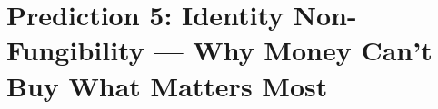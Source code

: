 \section{Prediction 5: Identity Non-Fungibility --- Why Money Can't Buy What Matters Most}
\label{app:prediction-identity}


\begin{abstract}
This appendix provides the complete technical foundation for Prediction 5 of the 
Complementarity-Context Framework: that identity constitutes a distinct welfare 
dimension that is not fungible with financial compensation. We develop the formal 
model of identity utility ($U^{IDN}$), estimate the identity-financial exchange 
rate, validate against job transition data and retraining program outcomes, and 
derive conditions under which compensation policies succeed or fail. The analysis 
explains why coal miners reject solar jobs, why displaced workers refuse higher 
wages, and why ``just retrain them'' consistently underperforms expectations.
\end{abstract}


